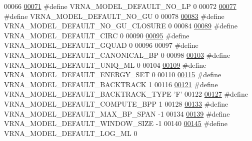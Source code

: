 \begin{DoxyCode}
00066 
\hypertarget{model_8h_source.tex_l00071}{}\hyperlink{group__model__details_gab72462726dd60ed0d43339bbf7ee08ad}{00071} \textcolor{preprocessor}{#define VRNA\_MODEL\_DEFAULT\_NO\_LP          0}
00072 
\hypertarget{model_8h_source.tex_l00077}{}\hyperlink{group__model__details_ga34702f7d14d38b877ba8e475281e97e2}{00077} \textcolor{preprocessor}{#define VRNA\_MODEL\_DEFAULT\_NO\_GU          0}
00078 
\hypertarget{model_8h_source.tex_l00083}{}\hyperlink{group__model__details_ga5308de46faaca4b9fd16045864901ee7}{00083} \textcolor{preprocessor}{#define VRNA\_MODEL\_DEFAULT\_NO\_GU\_CLOSURE  0}
00084 
\hypertarget{model_8h_source.tex_l00089}{}\hyperlink{group__model__details_ga22059033db7bcd875c51fec32425490a}{00089} \textcolor{preprocessor}{#define VRNA\_MODEL\_DEFAULT\_CIRC           0}
00090 
\hypertarget{model_8h_source.tex_l00095}{}\hyperlink{group__model__details_ga793ed812e86f43799b14b2deee917f23}{00095} \textcolor{preprocessor}{#define VRNA\_MODEL\_DEFAULT\_GQUAD          0}
00096 
00097 \textcolor{preprocessor}{#define VRNA\_MODEL\_DEFAULT\_CANONICAL\_BP   0}
00098 
\hypertarget{model_8h_source.tex_l00103}{}\hyperlink{group__model__details_ga63f6006a02ba2d89148441f406c309e7}{00103} \textcolor{preprocessor}{#define VRNA\_MODEL\_DEFAULT\_UNIQ\_ML        0}
00104 
\hypertarget{model_8h_source.tex_l00109}{}\hyperlink{group__model__details_ga6fcf6b2d0f89256cdbd166486c9b6e1e}{00109} \textcolor{preprocessor}{#define VRNA\_MODEL\_DEFAULT\_ENERGY\_SET     0}
00110 
\hypertarget{model_8h_source.tex_l00115}{}\hyperlink{group__model__details_ga3fda8006ab84baf817bd8e5ccbc6bb35}{00115} \textcolor{preprocessor}{#define VRNA\_MODEL\_DEFAULT\_BACKTRACK      1}
00116 
\hypertarget{model_8h_source.tex_l00121}{}\hyperlink{group__model__details_gad0e81fcaca53c4a826c68e0796de2afb}{00121} \textcolor{preprocessor}{#define VRNA\_MODEL\_DEFAULT\_BACKTRACK\_TYPE 'F'}
00122 
\hypertarget{model_8h_source.tex_l00127}{}\hyperlink{group__model__details_ga1d6cd5051940b126c248147c011bac6c}{00127} \textcolor{preprocessor}{#define VRNA\_MODEL\_DEFAULT\_COMPUTE\_BPP    1}
00128 
\hypertarget{model_8h_source.tex_l00133}{}\hyperlink{group__model__details_ga7cb6f4ae8fdebff6746a4410814f2977}{00133} \textcolor{preprocessor}{#define VRNA\_MODEL\_DEFAULT\_MAX\_BP\_SPAN    -1}
00134 
\hypertarget{model_8h_source.tex_l00139}{}\hyperlink{group__model__details_ga8de04a9cb57e811e313b0f9f207f6bdb}{00139} \textcolor{preprocessor}{#define VRNA\_MODEL\_DEFAULT\_WINDOW\_SIZE    -1}
00140 
\hypertarget{model_8h_source.tex_l00145}{}\hyperlink{group__model__details_ga938f68463e84fe060aa6502f428a517d}{00145} \textcolor{preprocessor}{#define VRNA\_MODEL\_DEFAULT\_LOG\_ML         0}

\end{DoxyCode}
